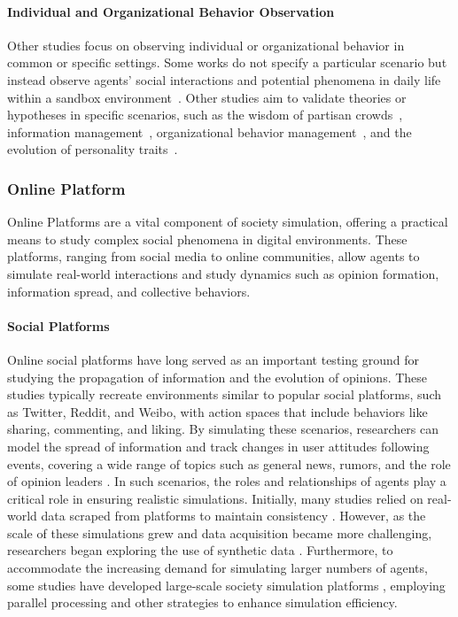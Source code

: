 \paragraph{Individual and Organizational Behavior Observation}
Other studies focus on observing individual or organizational behavior in common or specific settings. Some works do not specify a particular scenario but instead observe agents' social interactions and potential phenomena in daily life within a sandbox environment~\cite{park2023generative,kaiya2023lyfe,ren2024emergence,yu2024mineland}. 
Other studies aim to validate theories or hypotheses in specific scenarios, such as the wisdom of partisan crowds~\cite{chuang2024wisdom}, information management~\cite{park2023choicemates}, organizational behavior management~\cite{zhu2024generative}, and the evolution of personality traits~\cite{suzuki2024evolutionary}.



\subsubsection{Online Platform}
Online Platforms are a vital component of society simulation, offering a practical means to study complex social phenomena in digital environments. These platforms, ranging from social media to online communities, allow agents to simulate real-world interactions and study dynamics such as opinion formation, information spread, and collective behaviors. 
\paragraph{Social Platforms}
Online social platforms have long served as an important testing ground for studying the propagation of information and the evolution of opinions. These studies typically recreate environments similar to popular social platforms, such as Twitter, Reddit, and Weibo, with action spaces that include behaviors like sharing, commenting, and liking. By simulating these scenarios, researchers can model the spread of information and track changes in user attitudes following events, covering a wide range of topics such as general news, rumors, and the role of opinion leaders \cite{liu2024skepticism,gao2023s3,cai2024language,rossetti2024social,zhang2024large,liu2024tiny}. In such scenarios, the roles and relationships of agents play a critical role in ensuring realistic simulations. Initially, many studies relied on real-world data scraped from platforms to maintain consistency \cite{mou2024unveiling,gao2023s3}. However, as the scale of these simulations grew and data acquisition became more challenging, researchers began exploring the use of synthetic data \cite{yang2024oasis}. Furthermore, to accommodate the increasing demand for simulating larger numbers of agents, some studies have developed large-scale society simulation platforms \cite{gao2024agentscope,pan2024very}, employing parallel processing and other strategies to enhance simulation efficiency.

